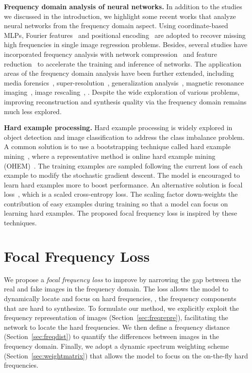\documentclass[10pt,twocolumn,letterpaper]{article}
\begin{document}
\noindent
\textbf{Frequency domain analysis of neural networks.}
In addition to the studies~\cite{spectralbias,nerf,fourierfeatures,fprinciple} we discussed in the introduction, we highlight some recent works that analyze neural networks from the frequency domain aspect.
Using coordinate-based MLPs, Fourier features~\cite{fourierfeatures,randomfeatures} and positional encoding~\cite{nerf,attention} are adopted to recover missing high frequencies in single image regression problems.
Besides, several studies have incorporated frequency analysis with network compression~\cite{fasternetjpeg,learninfreq,stylewavelet,compressfreq,notsobiggan} and feature reduction~\cite{featreduction,cnnpack} to accelerate the training and inference of networks.
The application areas of the frequency domain analysis have been further extended, including media forensics~\cite{cnndetection,artifactsganfake,fakeretouch,freqdeepfakeicml}, super-resolution~\cite{freqsepsr,dmawaresr}, generalization analysis~\cite{generalizefreq}, magnetic resonance imaging~\cite{jointfreq}, image rescaling~\cite{invertrescale}, \etc.
Despite the wide exploration of various problems, improving reconstruction and synthesis quality via the frequency domain remains much less explored.


\noindent
\textbf{Hard example processing.}
Hard example processing is widely explored in object detection and image classification to address the class imbalance problem.
A common solution is to use a bootstrapping technique called hard example mining~\cite{ohem,hempartmodel}, where a representative method is online hard example mining (OHEM)~\cite{ohem}. The training examples are sampled following the current loss of each example to modify the stochastic gradient descent. The model is encouraged to learn hard examples more to boost performance.
An alternative solution is focal loss~\cite{focalloss}, which is a scaled cross-entropy loss. The scaling factor down-weights the contribution of easy examples during training so that a model can focus on learning hard examples.
The proposed focal frequency loss is inspired by these techniques. 


%
 

\section{Focal Frequency Loss}
\label{sec:method}

We propose a \textit{focal frequency loss} to improve  by narrowing the gap between the real and fake images in the frequency domain.
The loss allows the model to dynamically locate and focus on hard frequencies, \ie, the frequency components that are hard to synthesize.
\fi
To formulate our method, we explicitly exploit the frequency representation of images (Section~\ref{sec:freqrepre}), facilitating the network to locate the hard frequencies.
We then define a frequency distance (Section~\ref{sec:freqdist}) to quantify the differences between images in the frequency domain.
Finally, we adopt a dynamic spectrum weighting scheme (Section~\ref{sec:weightmatrix}) that allows the model to focus on the on-the-fly hard frequencies.
\end{document}
